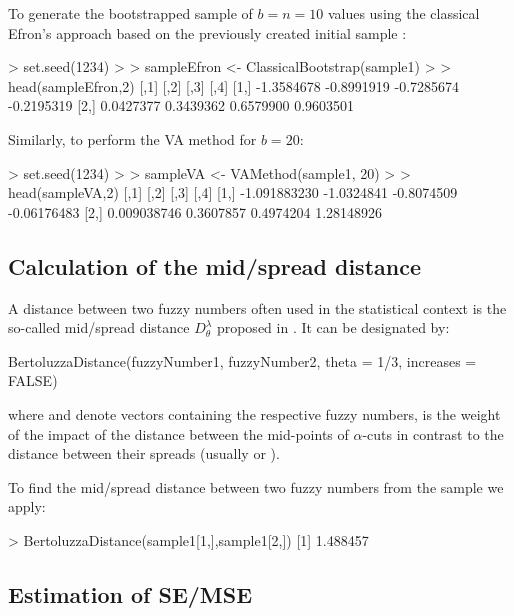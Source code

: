 To generate the bootstrapped sample of $b=n=10$ values using the classical Efron's approach based on the previously created initial sample :
\begin{example}
> set.seed(1234)
> 
> sampleEfron <- ClassicalBootstrap(sample1)
> 
> head(sampleEfron,2)
           [,1]       [,2]       [,3]       [,4]
[1,] -1.3584678 -0.8991919 -0.7285674 -0.2195319
[2,]  0.0427377  0.3439362  0.6579900  0.9603501
\end{example}
Similarly, to perform the VA method for $b=20$:
\begin{example}
> set.seed(1234)
> 
> sampleVA <- VAMethod(sample1, 20)
> 
> head(sampleVA,2)
             [,1]       [,2]       [,3]        [,4]
[1,] -1.091883230 -1.0324841 -0.8074509 -0.06176483
[2,]  0.009038746  0.3607857  0.4974204  1.28148926
\end{example}


\subsection{Calculation of the mid/spread distance}

A distance between two fuzzy numbers often used in the statistical context is the so-called mid/spread distance $D^{\lambda}_{\theta}$ proposed in \cite{Bertoluzza1995, T09}. 
It can be designated by:
\begin{example}
BertoluzzaDistance(fuzzyNumber1, fuzzyNumber2, theta = 1/3, increases = FALSE)
\end{example}
where  and  denote vectors containing the respective fuzzy numbers,  is the weight of the impact of the distance between the mid-points of $\alpha$-cuts in contrast to the distance between their spreads (usually  or ).

To find the mid/spread distance between two fuzzy numbers from the sample  we apply:
\begin{example}
> BertoluzzaDistance(sample1[1,],sample1[2,])
[1] 1.488457
\end{example}


\subsection{Estimation of SE/MSE}

